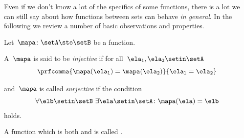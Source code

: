 Even if we don't know a lot of the specifics of some functions, there is a lot we can still say about how functions between sets can behave \emph{in general}.
In the following we review a number of basic observations and properties.

Let~$\mapa\colon \setA \sto \setB$ be a function.
\begin{ctdefinition}\label{def:injective-function}
    A~$\mapa$ is said to be \emph{injective} if for all~$\ela_1, \ela_2 \setin\setA$
    \begin{equation}
        \label{eq:injectivity-cond}
        \prfcomma{
            \mapa(\ela_1) = \mapa(\ela_2)
        }{
            \ela_1 = \ela_2
        }
    \end{equation}
\end{ctdefinition}

\begin{ctdefinition}\label{def:surjective-function}
    and~$\mapa$ is called \emph{surjective} if the condition
    \begin{equation}
        \label{eq:surjectivity-cond}
        \forall \elb \setin\setB \ \exists \ela \setin\setA \colon \mapa(\ela) = \elb
    \end{equation}
    holds.
\end{ctdefinition}
\begin{ctdefinition}\label{def:bijective-function}
    A function which is both  and  is called .
\end{ctdefinition}

\begin{marginfigure}
    \centering
    \caption{An  function.}
    \label{fig:inj-function}
\end{marginfigure}

\begin{marginfigure}
    \centering
    \caption{A  function.}
    \label{fig:surj-function}
\end{marginfigure}

